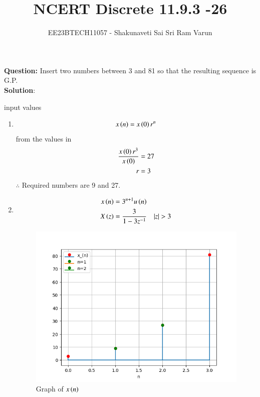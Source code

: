 \documentclass[journal,12pt,twocolumn]{IEEEtran}
\theoremstyle{remark}
\begin{document}

\vspace{3cm}

\title{NCERT Discrete 11.9.3 -26}
\author{EE23BTECH11057 - Shakunaveti Sai Sri Ram Varun$^{}$%
}
\maketitle
\newpage
\bigskip
\vspace{2cm}
\textbf{Question: }
Insert two numbers between 3 and 81 so that the resulting sequence is G.P.\\
\textbf{Solution}:\\
\begin{table}[htbp] 
\centering

\caption{input values}
\label{tab: Table 11.9.3.26.15}
\end{table}
\begin{enumerate}
\item 
\begin{align}
x\left(n\right)=x\left(0\right)r^{n}
\end{align}
from the values in 
\begin{align}
\frac{x\left(0\right)r^3}{x\left(0\right)}&=27\\
r&=3
\end{align}
$ \therefore $ Required numbers are 9 and 27.
\item 
\begin{align}
x\brak{n} &= 3^{n+1}u\brak{n} \label{eq:11.9.3.26.1}\\
X\brak{z} &= \frac{3}{1-3z^{-1}} \quad |z|>3 \label{eq:11.9.3.26.2}
\end{align}
\begin{figure}[h!]
    \includegraphics[width = \columnwidth]{figs/Figure_1.png}
    \caption{Graph of $ x\left(n\right)$ }
    \label{fig: 11.9.3.26.17}
\end{figure}
\end{enumerate}
\end{document}
